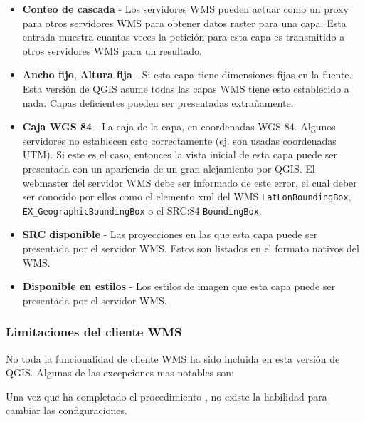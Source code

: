 \begin{itemize}
\begin{itemize}
\item \textbf{Conteo de cascada}    - Los servidores WMS pueden actuar como un proxy para otros servidores WMS para obtener datos raster para una capa. Esta entrada muestra cuantas veces la petición para esta capa es transmitido a otros servidores WMS para un resultado.

\item \textbf{Ancho fijo}, \textbf{Altura fija}
                                - Si esta capa tiene dimensiones fijas en la fuente. Esta versión de QGIS asume todas las capas WMS tiene esto establecido a nada. Capas deficientes pueden ser presentadas extrañamente.

\item \textbf{Caja WGS 84} - La caja de la capa, en coordenadas WGS 84. Algunos servidores no establecen esto correctamente (ej. son usadas coordenadas UTM). Si este es el caso, entonces la vista inicial de esta capa puede ser presentada con un apariencia de un gran alejamiento por QGIS. El webmaster del servidor WMS debe ser informado de este error, el cual deber ser conocido por ellos como el elemento xml del WMS                                     \texttt{LatLonBoundingBox},                                      \texttt{EX\_GeographicBoundingBox} o el SRC:84 \texttt{BoundingBox}.

\item \textbf{SRC disponible} - Las proyecciones en las que esta capa puede ser presentada por el servidor WMS.  Estos son listados en el formato nativos del WMS.

\item \textbf{Disponible en estilos} - Los estilos de imagen que esta capa puede ser presentada por el servidor WMS.

\end{itemize}

\end{itemize}


\subsubsection{Limitaciones del cliente WMS}\label{sec:ogc-wms-limits}

No toda la funcionalidad de cliente WMS ha sido incluida en esta versión de  QGIS.
Algunas de las excepciones mas notables son:


Una vez que ha completado el procedimiento , no existe la habilidad para cambiar las configuraciones.


